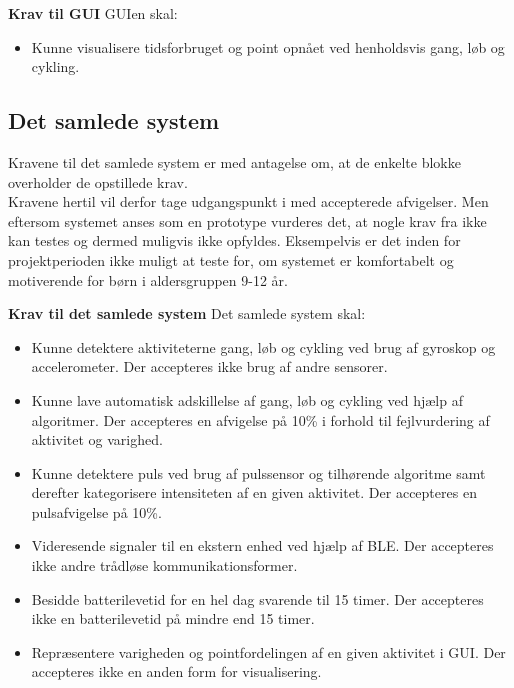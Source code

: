 \textbf{Krav til GUI} \newline 
GUIen skal:
\begin{itemize}
	\item Kunne visualisere tidsforbruget og point opnået ved henholdsvis gang, løb og cykling. 
\end{itemize}

\subsection{Det samlede system} \label{krav_samlet_sys}
Kravene til det samlede system er med antagelse om, at de enkelte blokke overholder de opstillede krav.\\
Kravene hertil vil derfor tage udgangspunkt i  med accepterede afvigelser. Men eftersom systemet anses som en prototype vurderes det, at nogle krav fra  ikke kan testes og dermed muligvis ikke opfyldes. %
Eksempelvis er det inden for projektperioden ikke muligt at teste for, om systemet er komfortabelt og motiverende for børn i aldersgruppen 9-12 år.

\textbf{Krav til det samlede system} \newline
Det samlede system skal:
\begin{itemize}
	\item Kunne detektere aktiviteterne gang, løb og cykling ved brug af gyroskop og accelerometer. Der accepteres ikke brug af andre sensorer.
	\item Kunne lave automatisk adskillelse af gang, løb og cykling ved hjælp af algoritmer. Der accepteres en afvigelse på 10\% i forhold til fejlvurdering af aktivitet og varighed.
	\item Kunne detektere puls ved brug af pulssensor og tilhørende algoritme samt derefter kategorisere intensiteten af en given aktivitet. Der accepteres en pulsafvigelse på 10\%.
	\item Videresende signaler til en ekstern enhed ved hjælp af BLE. Der accepteres ikke andre trådløse kommunikationsformer.
	\item Besidde batterilevetid for en hel dag svarende til 15 timer. Der accepteres ikke en batterilevetid på mindre end 15 timer.
	\item Repræsentere varigheden og pointfordelingen af en given aktivitet i GUI. Der accepteres ikke en anden form for visualisering. 
\end{itemize}

